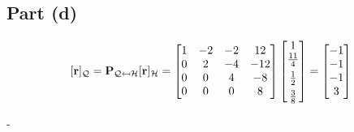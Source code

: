 \documentclass{article}
\begin{document}
\subsection{Part (d)} 

\[%
    [\mathbf{r}]_{\mathcal{Q}}
    =
    \mathbf{P}_{\mathcal{Q}\mapsfrom \mathcal{H}}
    [\mathbf{r}]_{\mathcal{H}}
    =
    \begin{bmatrix} 
        1 & -2 & -2 & 12 \\
		0 & 2  & -4 & -12 \\
		0 & 0  & 4  & -8 \\
		0 & 0  & 0  & 8 \\		
    \end{bmatrix}
    \begin{bmatrix} 
        1\\
        \frac{11}{4} \vspace{1.5mm} \\
        \frac{1}{2}  \vspace{1.5mm} \\ 
        \frac{3}{8}  
    \end{bmatrix}
    =
    \begin{bmatrix} -1\\-1\\-1\\3 \end{bmatrix}
\]%

 
 




\clearpage



-
\end{document}
